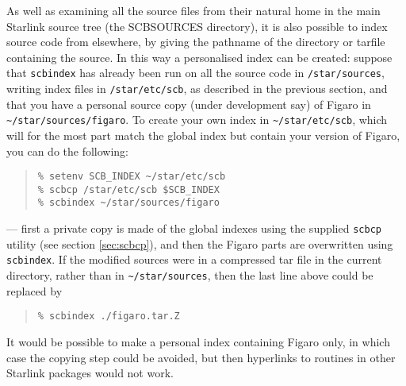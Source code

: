 \documentclass[twoside,11pt]{article}
\renewcommand{\_}{\texttt{\symbol{95}}}
\begin{document}
As well as examining all the source files from their natural home
in the main Starlink source tree (the SCB\_SOURCES directory),
it is also possible to index source code from elsewhere, 
by giving the pathname of the directory
or tarfile containing the source.
In this way a personalised index can be created: 
suppose that {\tt scbindex} has already been run 
on all the source code in {\tt /star/sources}, 
writing index files in {\tt /star/etc/scb}, as described in 
the previous section, 
and that you have a personal source copy (under development say) of 
Figaro in \verb|~/star/sources/figaro|.
To create your own index in \verb|~/star/etc/scb|, 
which will for the most part match the global index 
but contain your version of Figaro,
you can do the following:
\begin{quote}
\begin{verbatim}
% setenv SCB_INDEX ~/star/etc/scb
% scbcp /star/etc/scb $SCB_INDEX
% scbindex ~/star/sources/figaro
\end{verbatim}
\end{quote}
--- first a private copy is made of the global indexes using 
the supplied {\tt scbcp} utility (see section \ref{sec:scbcp}),
and then the Figaro parts are overwritten using {\tt scbindex}.
If the modified sources were 
in a compressed tar file in the current directory, 
rather than in \verb|~/star/sources|,
then the last line above could be replaced by
\begin{quote}
\begin{verbatim}
% scbindex ./figaro.tar.Z
\end{verbatim}
\end{quote}
It would be possible to make a personal index containing Figaro only,
in which case the copying step could be avoided, 
but then hyperlinks to routines in other Starlink packages 
would not work.
\end{document}
